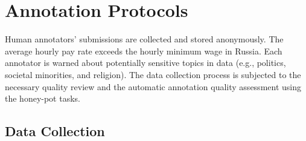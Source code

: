 \documentclass[11pt]{article}
\begin{document}
 


 

\twocolumn


\section{Annotation Protocols}
\label{sec:appendix_annotation}
Human annotators' submissions are collected and stored anonymously. The average hourly pay rate exceeds the hourly minimum wage in Russia. Each annotator is warned about potentially sensitive topics in data (e.g., politics, societal minorities, and religion).
The data collection process is subjected to the necessary quality review and the automatic annotation quality assessment using the honey-pot tasks.
\subsection{Data Collection}
\label{app:data_collection}
\end{document}
